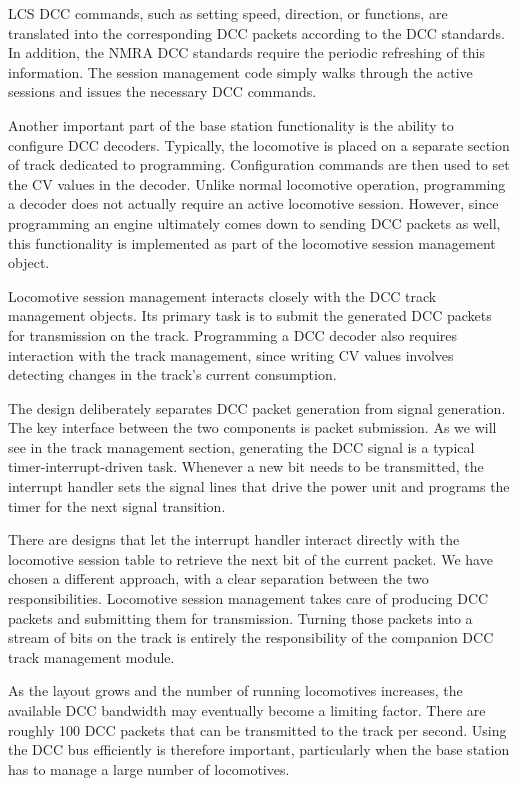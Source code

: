 LCS DCC commands, such as setting speed, direction, or functions, are translated into the corresponding DCC packets according to the DCC standards. In addition, the NMRA DCC standards require the periodic refreshing of this information. The session management code simply walks through the active sessions and issues the necessary DCC commands.

Another important part of the base station functionality is the ability to configure DCC decoders. Typically, the locomotive is placed on a separate section of track dedicated to programming. Configuration commands are then used to set the CV values in the decoder. Unlike normal locomotive operation, programming a decoder does not actually require an active locomotive session. However, since programming an engine ultimately comes down to sending DCC packets as well, this functionality is implemented as part of the locomotive session management object.

Locomotive session management interacts closely with the DCC track management objects. Its primary task is to submit the generated DCC packets for transmission on the track. Programming a DCC decoder also requires interaction with the track management, since writing CV values involves detecting changes in the track’s current consumption.

The design deliberately separates DCC packet generation from signal generation. The key interface between the two components is packet submission.
As we will see in the track management section, generating the DCC signal is a typical timer-interrupt-driven task. Whenever a new bit needs to be transmitted, the interrupt handler sets the signal lines that drive the power unit and programs the timer for the next signal transition.

There are designs that let the interrupt handler interact directly with the locomotive session table to retrieve the next bit of the current packet. We have chosen a different approach, with a clear separation between the two responsibilities. Locomotive session management takes care of producing DCC packets and submitting them for transmission. Turning those packets into a stream of bits on the track is entirely the responsibility of the companion DCC track management module.

As the layout grows and the number of running locomotives increases, the available DCC bandwidth may eventually become a limiting factor. There are roughly 100 DCC packets that can be transmitted to the track per second. Using the DCC bus efficiently is therefore important, particularly when the base station has to manage a large number of locomotives.

